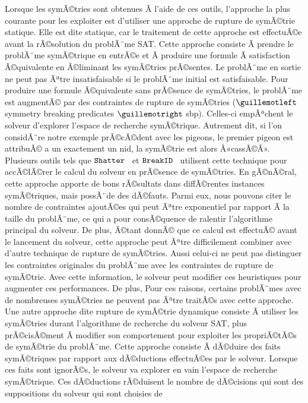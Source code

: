 Lorsque les symÃ©tries sont obtenues Ã  l'aide de ces outils, l'approche la plus courante pour les exploiter est d'utiliser une approche de rupture de symÃ©trie statique. Elle est dite statique, car le traitement de cette approche  est effectuÃ©e avant la rÃ©solution du problÃ¨me SAT.
Cette approche consiste Ã  prendre le problÃ¨me symÃ©trique en entrÃ©e et Ã  produire une formule Ã  satisfaction Ã©quivalente en Ã©liminant les symÃ©tries prÃ©sentes. Le problÃ¨me en sortie ne peut pas Ãªtre insatisfaisable si le problÃ¨me initial est satisfaisable.
Pour produire une formule Ã©quivalente sans prÃ©sence de symÃ©tries, le problÃ¨me est augmentÃ© par des 
contraintes de rupture de  symÃ©tries ($\guillemotleft$symmetry breaking predicates $\guillemotright$ sbp). Celles-ci empÃªchent le solveur d'explorer l'espace de recherche symÃ©trique. 
Autrement dit, si l'on considÃ¨re notre exemple prÃ©cÃ©dent avec les pigeons, le premier pigeon est attribuÃ© a un
exactement un nid, la symÃ©trie est alors Â«cassÃ©Â».
Plusieurs outils tels que $\texttt{Shatter}$~\cite{aloul06} et $\texttt{BreakID}$~\cite{devriendt2016improved}  utilisent cette technique pour accÃ©lÃ©rer le calcul du solveur en prÃ©sence de symÃ©tries.
En gÃ©nÃ©ral, cette approche apporte de bons rÃ©sultats dans diffÃ©rentes instances symÃ©triques, mais possÃ¨de des dÃ©fauts. Parmi eux, nous pouvons citer le nombre de contraintes ajoutÃ©es qui peut Ãªtre exponentiel par rapport Ã  la taille du problÃ¨me, ce qui a pour consÃ©quence de ralentir l'algorithme principal du solveur.
De plus, Ã©tant donnÃ© que ce calcul est effectuÃ© avant le lancement du solveur, cette approche peut Ãªtre difficilement combiner avec d'autre technique de rupture de symÃ©tries. Aussi celui-ci ne peut pas distinguer les contraintes originales du problÃ¨me avec les contraintes de rupture de symÃ©trie. Avec cette information, le solveur peut modifier ces heuristiques pour augmenter ces performances. De plus, 
Pour ces raisons, certains problÃ¨mes avec de nombreuses symÃ©tries ne peuvent pas Ãªtre traitÃ©s avec cette approche.
Une autre approche dite rupture de symÃ©trie dynamique consiste Ã  utiliser les symÃ©tries durant l'algorithme de recherche du solveur SAT, plus prÃ©cisÃ©ment Ã  modifier son comportement pour exploiter les propriÃ©tÃ©s de symÃ©trie du problÃ¨me. Cette approche consiste Ã  dÃ©duire des faits symÃ©triques par rapport aux dÃ©ductions effectuÃ©es par le solveur. Lorsque ces faits sont ignorÃ©s, le solveur va explorer en vain l'espace de recherche symÃ©trique.
Ces dÃ©ductions rÃ©duisent le nombre de dÃ©cisions qui sont des suppositions du solveur qui sont choisies de 
